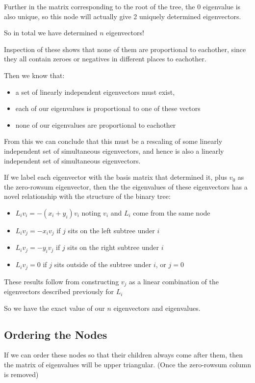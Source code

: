 \documentclass{report}
\begin{document}
Further in the matrix corresponding to the root of the tree, the $0$ eigenvalue
is also unique, so this node will actually give 2 uniquely determined
eigenvectors.

So in total we have determined $n$ eigenvectors!

Inspection of these shows that none of them are proportional to eachother,
since they all contain zeroes or negatives in different places to eachother.

Then we know that:
\begin{itemize}
	\item a set of linearly independent eigenvectors must exist,
	\item each of our eigenvalues is proportional to one of these vectors
	\item none of our eigenvalues are proportional to eachother
\end{itemize}
From this we can conclude that this must be a rescaling of some linearly
independent set of simultaneous eigenvectors, and hence is also a linearly
independent set of simultaneous eigenvectors.

If we label each eigenvector with the basis matrix that determined it, plus
$v_0$ as the zero-rowsum eigenvector, then the the eigenvalues of these
eigenvectors has a novel relationship with the structure of the binary tree:
\begin{itemize}
	\item $L_iv_i = -(x_i + y_i)v_i$ noting $v_i$ and $L_i$ come from the same
		node
	\item $L_iv_j = -x_iv_j$ if $j$ sits on the left subtree under $i$
	\item $L_iv_j = -y_iv_j$ if $j$ sits on the right subtree under $i$
	\item $L_iv_j = 0$ if $j$ sits outside of the subtree under $i$, or $j=0$
\end{itemize}

These results follow from constructing $v_j$ as a linear combination of the
eigenvectors described previously for $L_i$

So we have the exact value of our $n$ eigenvectors and eigenvalues.

\subsection{Ordering the Nodes}

If we can order these nodes so that their children always come after them, then
the matrix of eigenvalues will be upper triangular. (Once the zero-rowsum
column is removed)
\end{document}
